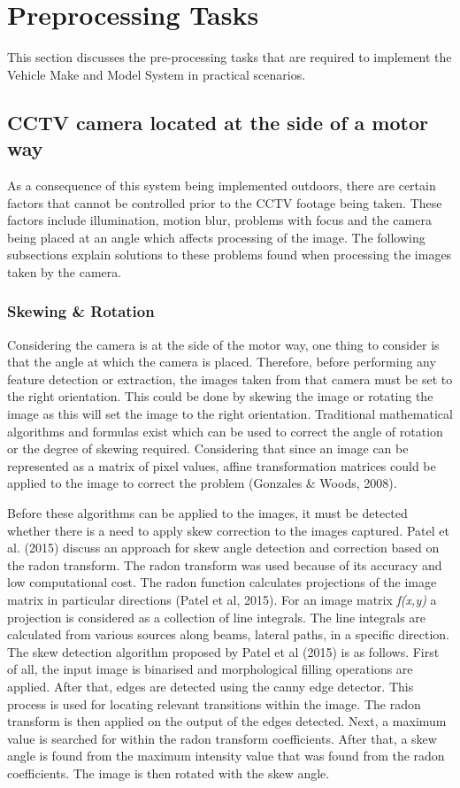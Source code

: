 \documentclass[a4paper, 12pt]{article}
\begin{document}
 \section{Preprocessing Tasks}
 This section discusses the pre-processing tasks that are required to implement the Vehicle Make and Model System in practical scenarios.
 
 \subsection{CCTV camera located at the side of a motor way}
 As a consequence of this system being implemented outdoors, there are certain factors that cannot be controlled prior to the CCTV footage being taken. These factors include illumination, motion blur, problems with focus and the camera being placed at an angle  which affects processing of the image. The following subsections explain solutions to these problems found when processing the images taken by the camera. 
 
 \subsubsection{Skewing \& Rotation}
Considering the camera is at the side of the motor way, one thing to consider is that the angle at which the camera is placed. Therefore, before performing any feature detection or extraction, the images taken from that camera must be set to the right orientation. This could be done by skewing the image or rotating the image as this will set the image to the right orientation. Traditional mathematical algorithms and formulas exist which can be used to correct the angle of rotation or the degree of skewing required. Considering that since an image can be represented as a matrix of pixel values, affine transformation matrices could be applied to the image to correct the problem (Gonzales \& Woods, 2008).
\parskip 0.2in 

Before these algorithms can be applied to the images, it must be detected whether there is a need to apply skew correction to the images captured. Patel et al. (2015) discuss an approach for skew angle detection and correction based on the radon transform. The radon transform was used because of its accuracy and low computational cost. The radon function calculates projections of the image matrix in particular directions (Patel et al, 2015). For an image matrix \textit{f(x,y)} a projection is considered as a collection of line integrals. The line integrals are calculated from various sources along beams, lateral paths, in a specific direction. The skew detection algorithm proposed by Patel et al (2015) is as follows. First of all, the input image is binarised and morphological filling operations are applied. After that, edges are detected using the canny edge detector. This process is used for locating relevant transitions within the image. The radon transform is then applied on the output of the edges detected. Next, a maximum value is searched for within the radon transform coefficients. After that, a skew angle is found from the maximum intensity value that was found from the radon coefficients. The image is then rotated with the skew angle. 
\end{document}
